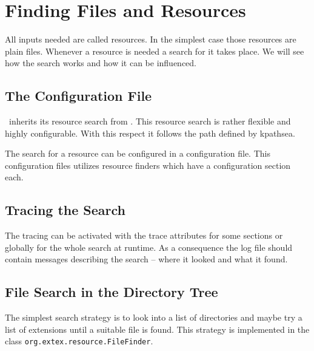 
\def\LogArg#1{$\langle${\itshape #1}$\rangle$}

\section{Finding Files and Resources}

All inputs needed are called resources. In the simplest case those
resources are plain files. Whenever a resource is needed a search for
it takes place. We will see how the search works and how it can be
influenced.


\subsection{The Configuration File}

\ExBib\ inherits its resource search from \ExTeX{}.
This resource search is rather flexible and highly configurable. With
this respect it follows the path defined by kpathsea.

The search for a resource can be configured in a configuration file.
This configuration files utilizes resource finders which have a
configuration section each.

\INCOMPLETE


\subsection{Tracing the Search}

The tracing can be activated with the trace attributes for some
sections or globally for the whole search at runtime. As a consequence
the log file should contain messages describing the search -- where it
looked and what it found.


\subsection{File Search in the Directory Tree}

The simplest search strategy is to look into a list of directories and
maybe try a list of extensions until a suitable file is found. This
strategy is implemented in the class
\texttt{org.extex.resource.FileFinder}.

